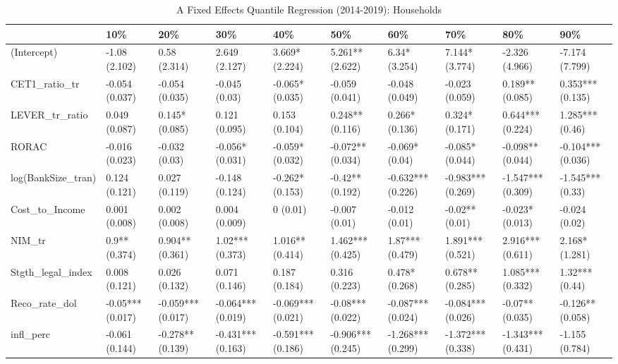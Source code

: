 \begin{table}[ht]
\centering
\caption{A Fixed Effects Quantile Regression (2014-2019): Households} 
\begingroup\small
\begin{tabular}{llllllllll}
  \toprule
 & 10\% & 20\% & 30\% & 40\% & 50\% & 60\% & 70\% & 80\% & 90\% \\ 
  \midrule
(Intercept) & -1.08 (2.102) & 0.58 (2.314) & 2.649 (2.127) & 3.669* (2.224) & 5.261** (2.622) & 6.34* (3.254) & 7.144* (3.774) & -2.326 (4.966) & -7.174 (7.799) \\ 
  CET1\_ratio\_tr & -0.054 (0.037) & -0.054 (0.035) & -0.045 (0.03) & -0.065* (0.035) & -0.059 (0.041) & -0.048 (0.049) & -0.023 (0.059) & 0.189** (0.085) & 0.353*** (0.135) \\ 
  LEVER\_tr\_ratio & 0.049 (0.087) & 0.145* (0.085) & 0.121 (0.095) & 0.153 (0.104) & 0.248** (0.116) & 0.266* (0.136) & 0.324* (0.171) & 0.644*** (0.224) & 1.285*** (0.46) \\ 
  RORAC & -0.016 (0.023) & -0.032 (0.03) & -0.056* (0.031) & -0.059* (0.032) & -0.072** (0.034) & -0.069* (0.04) & -0.085* (0.044) & -0.098** (0.044) & -0.104*** (0.036) \\ 
  log(BankSize\_tran) & 0.124 (0.121) & 0.027 (0.119) & -0.148 (0.124) & -0.262* (0.153) & -0.42** (0.192) & -0.632*** (0.226) & -0.983*** (0.269) & -1.547*** (0.309) & -1.545*** (0.33) \\ 
  Cost\_to\_Income & 0.001 (0.008) & 0.002 (0.008) & 0.004 (0.009) & 0 (0.01) & -0.007 (0.01) & -0.012 (0.01) & -0.02** (0.01) & -0.023* (0.013) & -0.024 (0.02) \\ 
  NIM\_tr & 0.9** (0.374) & 0.904** (0.361) & 1.02*** (0.373) & 1.016** (0.414) & 1.462*** (0.425) & 1.87*** (0.479) & 1.891*** (0.521) & 2.916*** (0.611) & 2.168* (1.281) \\ 
  Stgth\_legal\_index & 0.008 (0.121) & 0.026 (0.132) & 0.071 (0.146) & 0.187 (0.184) & 0.316 (0.223) & 0.478* (0.268) & 0.678** (0.285) & 1.085*** (0.332) & 1.32*** (0.44) \\ 
  Reco\_rate\_dol & -0.05*** (0.017) & -0.059*** (0.017) & -0.064*** (0.019) & -0.069*** (0.021) & -0.08*** (0.022) & -0.087*** (0.024) & -0.084*** (0.026) & -0.07** (0.035) & -0.126** (0.058) \\ 
  infl\_perc & -0.061 (0.144) & -0.278** (0.139) & -0.431*** (0.163) & -0.591*** (0.186) & -0.906*** (0.245) & -1.268*** (0.299) & -1.372*** (0.338) & -1.343*** (0.431) & -1.155 (0.784) \\ 

\end{tabular}
\end{table}
